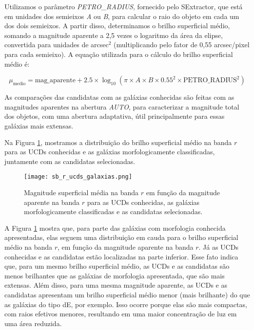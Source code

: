 Utilizamos o parâmetro \textit{PETRO\_RADIUS}, fornecido pelo SExtractor, que está em unidades dos semieixos \textit{A} ou \textit{B}, para calcular o raio do objeto em cada um dos dois semieixos. A partir disso, determinamos o brilho superficial médio, somando a magnitude aparente a 2,5 vezes o logaritmo da área da elipse, convertida para unidades de arcsec$^2$ (multiplicando pelo fator de 0,55 arcsec/pixel para cada semieixo). A equação utilizada para o cálculo do brilho superficial médio é:

\begin{equation}
    \mu_{\text{medio}} = \text{mag\_aparente} + 2.5 \times \log_{10}(\pi \times A \times B \times 0.55^2 \times \text{PETRO\_RADIUS}^2)
    \label{equation_sb}
\end{equation}

As comparações das candidatas com as galáxias conhecidas são feitas com as magnitudes aparentes na abertura \textit{AUTO}, para caracterizar a magnitude total dos objetos, com uma abertura adaptativa, útil principalmente para essas galáxias mais extensas.

Na Figura \ref{sb_r_ucds_galaxias}, mostramos a distribuição do brilho superficial médio na banda $r$ para as UCDs conhecidas e as galáxias morfologicamente classificadas, juntamente com as candidatas selecionadas.

\begin{figure}[!ht]
    \begin{center}
    \texttt{[image: sb\_r\_ucds\_galaxias.png]}
    \caption[]{Magnitude superficial média na banda $r$ em função da magnitude aparente na banda $r$ para as UCDs conhecidas, as galáxias morfologicamente classificadas e as candidatas selecionadas.}
    \label{sb_r_ucds_galaxias}
    \end{center}
\end{figure}

A Figura \ref{sb_r_ucds_galaxias} mostra que, para parte das galáxias com morfologia conhecida apresentadas, elas seguem uma distribuição em cauda para o brilho superficial médio na banda $r$, em função da magnitude aparente na banda $r$. Já as UCDs conhecidas e as candidatas estão localizadas na parte inferior. Esse fato indica que, para um mesmo brilho superficial médio, as UCDs e as candidatas são menos brilhantes que as galáxias de morfologia apresentada, que são mais extensas. Além disso, para uma mesma magnitude aparente, as UCDs e as candidatas apresentam um brilho superficial médio menor (mais brilhante) do que as galáxias do tipo dE, por exemplo. Isso ocorre porque elas são mais compactas, com raios efetivos menores, resultando em uma maior concentração de luz em uma área reduzida.

